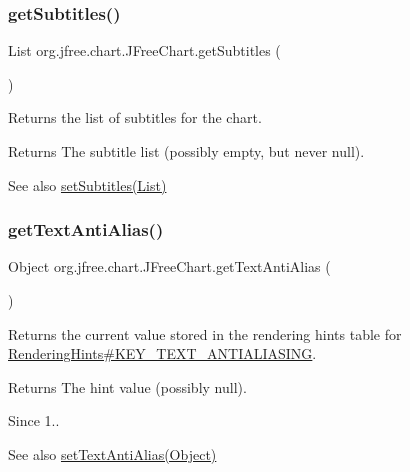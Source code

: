 \subsubsection{\texorpdfstring{get\+Subtitles()}{getSubtitles()}}
{\footnotesize\ttfamily List org.\+jfree.\+chart.\+J\+Free\+Chart.\+get\+Subtitles (\begin{DoxyParamCaption}{ }\end{DoxyParamCaption})}

Returns the list of subtitles for the chart.

\begin{DoxyReturn}{Returns}
The subtitle list (possibly empty, but never {\ttfamily null}).
\end{DoxyReturn}
\begin{DoxySeeAlso}{See also}
\mbox{\hyperlink{classorg_1_1jfree_1_1chart_1_1_j_free_chart_a8ead70270292a750391e3deec8a78d4f}{set\+Subtitles(\+List)}} 
\end{DoxySeeAlso}
\mbox{\label{classorg_1_1jfree_1_1chart_1_1_j_free_chart_a80d0c9c6238fbfc3a956f0bf382ab190}} 
\subsubsection{\texorpdfstring{get\+Text\+Anti\+Alias()}{getTextAntiAlias()}}
{\footnotesize\ttfamily Object org.\+jfree.\+chart.\+J\+Free\+Chart.\+get\+Text\+Anti\+Alias (\begin{DoxyParamCaption}{ }\end{DoxyParamCaption})}

Returns the current value stored in the rendering hints table for \mbox{\hyperlink{}{Rendering\+Hints\#\+K\+E\+Y\+\_\+\+T\+E\+X\+T\+\_\+\+A\+N\+T\+I\+A\+L\+I\+A\+S\+I\+NG}}.

\begin{DoxyReturn}{Returns}
The hint value (possibly {\ttfamily null}).
\end{DoxyReturn}
\begin{DoxySince}{Since}
1..
\end{DoxySince}
\begin{DoxySeeAlso}{See also}
\mbox{\hyperlink{classorg_1_1jfree_1_1chart_1_1_j_free_chart_a9a0b1e4d2667ad9e3def3c1e7ea9a94e}{set\+Text\+Anti\+Alias(\+Object)}} 
\end{DoxySeeAlso}
\mbox{\label{classorg_1_1jfree_1_1chart_1_1_j_free_chart_a4874b3d8f2ebef141b31764ff698fa05}} 
